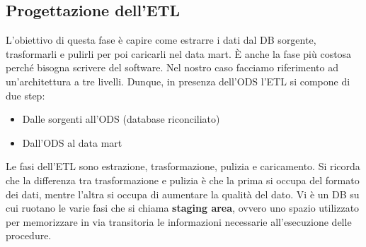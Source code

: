 \subsection{Progettazione dell'ETL}
L’obiettivo di questa fase è capire come estrarre i dati dal DB sorgente, trasformarli e pulirli per poi caricarli nel data mart. È anche la fase più costosa perché bisogna scrivere del software. Nel nostro caso facciamo riferimento ad un’architettura a tre livelli. Dunque, in presenza dell’ODS l’ETL si compone di due step:
\begin{itemize}
	\item 
	Dalle sorgenti all’ODS (database riconciliato)
	\item 
	Dall’ODS al data mart
\end{itemize}
Le fasi dell’ETL sono estrazione, trasformazione, pulizia e caricamento. Si ricorda che la differenza tra trasformazione e pulizia è che la prima si occupa del formato dei dati, mentre l'altra si occupa di aumentare la qualità del dato. Vi è un DB su cui ruotano le varie fasi che si chiama \textbf{staging area}, ovvero uno spazio utilizzato per memorizzare in via transitoria le informazioni necessarie all’esecuzione delle procedure.


